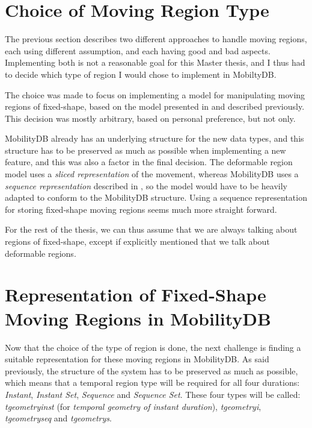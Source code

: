 
\section{Choice of Moving Region Type}
\label{section:region_type_choice}

The previous section describes two different approaches to handle moving regions, each using different assumption, and each having good and bad aspects. Implementing both is not a reasonable goal for this Master thesis, and I thus had to decide which type of region I would chose to implement in MobiltyDB.

The choice was made to focus on implementing a model for manipulating moving regions of fixed-shape, based on the model presented in \cite{fmregion} and described previously. This decision was mostly arbitrary, based on personal preference, but not only. 

MobilityDB already has an underlying structure for the new data types, and this structure has to be preserved as much as possible when implementing a new feature, and this was also a factor in the final decision. The deformable region model uses a \textit{sliced representation} of the movement, whereas MobilityDB uses a \textit{sequence representation} described in \cite{mobilitydb}, so the model would have to be heavily adapted to conform to the MobilityDB structure. Using a sequence representation for storing fixed-shape moving regions seems much more straight forward.

For the rest of the thesis, we can thus assume that we are always talking about regions of fixed-shape, except if explicitly mentioned that we talk about deformable regions.

\section{Representation of Fixed-Shape Moving Regions in MobilityDB}
\label{section:internal_repr}

Now that the choice of the type of region is done, the next challenge is finding a suitable representation for these moving regions in MobilityDB. As said previously, the structure of the system has to be preserved as much as possible, which means that a temporal region type will be required for all four durations: \textit{Instant}, \textit{Instant Set}, \textit{Sequence} and \textit{Sequence Set}. These four types will be called: \textit{tgeometryinst} (for \textit{temporal geometry of instant duration}), \textit{tgeometryi}, \textit{tgeometryseq} and \textit{tgeometrys}.


